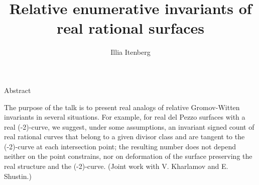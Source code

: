 \documentclass[a4paper,12pt]{article}
\begin{document}
\title{Relative enumerative invariants of real rational surfaces}
\author{Illia Itenberg}
\date{}
\maketitle

\begin{center}
{\Large Abstract}
\end{center}
The purpose of the talk is to present real analogs of relative Gromov-Witten invariants in several situations.
For example, for real del Pezzo surfaces with a real (-2)-curve, we suggest, under some assumptions,
an invariant signed count of real rational curves 
that belong to a given divisor class and are tangent to the (-2)-curve at each intersection point;
the resulting number does not depend neither on the point constrains,
nor on deformation of the surface preserving the real structure and the (-2)-curve.
(Joint work with V. Kharlamov and E. Shustin.)
\end{document}

